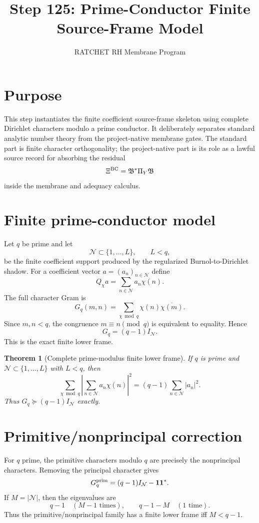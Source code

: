 \documentclass[11pt]{article}
\title{Step 125: Prime-Conductor Finite Source-Frame Model}
\author{RATCHET RH Membrane Program}
\date{}
\newtheorem{theorem}{Theorem}
\begin{document}
\maketitle

\section{Purpose}
This step instantiates the finite coefficient source-frame skeleton using complete Dirichlet characters modulo a prime conductor.  It deliberately separates standard analytic number theory from the project-native membrane gates.  The standard part is finite character orthogonality; the project-native part is its role as a lawful source record for absorbing the residual
\[
\Xi^{\rm BC}=\mathfrak B^*\Pi_Y\mathfrak B
\]
inside the membrane and adequacy calculus.

\section{Finite prime-conductor model}
Let $q$ be prime and let
\[
\mathcal N\subset\{1,\dots,L\},\qquad L<q,
\]
be the finite coefficient support produced by the regularized Burnol-to-Dirichlet shadow.  For a coefficient vector $a=(a_n)_{n\in\mathcal N}$ define
\[
Q_\chi a=\sum_{n\in\mathcal N}a_n\chi(n).
\]
The full character Gram is
\[
G_q(m,n)=\sum_{\chi\bmod q}\chi(n)\overline{\chi(m)}.
\]
Since $m,n<q$, the congruence $m\equiv n\pmod q$ is equivalent to equality.  Hence
\[
G_q=(q-1)I_{\mathcal N}.
\]
This is the exact finite lower frame.

\begin{theorem}[Complete prime-modulus finite lower frame]
If $q$ is prime and $\mathcal N\subset\{1,\dots,L\}$ with $L<q$, then
\[
\sum_{\chi\bmod q}\left|\sum_{n\in\mathcal N}a_n\chi(n)\right|^2
=(q-1)\sum_{n\in\mathcal N}|a_n|^2.
\]
Thus $G_q\succeq(q-1)I_{\mathcal N}$ exactly.
\end{theorem}

\section{Primitive/nonprincipal correction}
For $q$ prime, the primitive characters modulo $q$ are precisely the nonprincipal characters.  Removing the principal character gives
\[
G_q^{\rm prim}=(q-1)I_{\mathcal N}-\mathbf 1\mathbf 1^*.
\]
If $M=|\mathcal N|$, then the eigenvalues are
\[
q-1\quad(M-1\text{ times}),
\qquad q-1-M\quad(1\text{ time}).
\]
Thus the primitive/nonprincipal family has a finite lower frame iff $M<q-1$.
\end{document}
